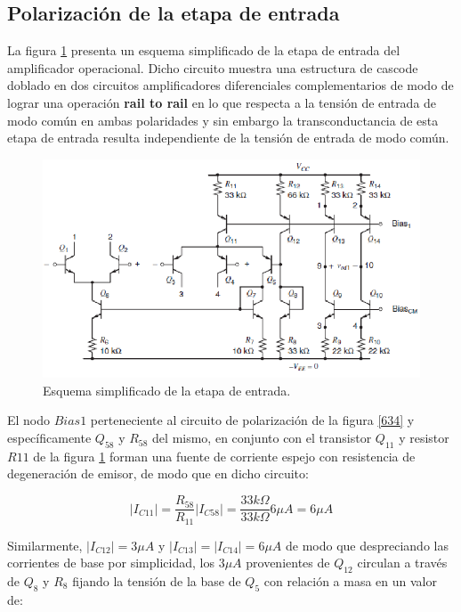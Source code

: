 \documentclass[12pt,a4paper,final,headinclude,footinclude,BCOR5mm]{scrartcl}
\begin{document}
\subsection{Polarización de la etapa de entrada}

La figura \ref{636} presenta un esquema simplificado de la etapa de entrada del amplificador operacional. Dicho circuito muestra una estructura de cascode doblado en dos circuitos amplificadores diferenciales complementarios de modo de lograr una operación \textbf{rail to rail} en lo que respecta a la tensión de entrada de modo común en ambas polaridades y sin embargo la transconductancia de esta etapa de entrada resulta independiente de la tensión de entrada de modo común.\\

\begin{figure}[!h]
\begin{center}
\includegraphics[width=400pt]{./imagenes/inputne5234.png}
\end{center}
\caption{Esquema simplificado de la etapa de entrada.}
\label{636}
\end{figure}

El nodo $Bias1$ perteneciente al circuito de polarización de la figura \ref{634}  y específicamente $Q_{58}$ y $R_{58}$ del mismo, en conjunto con el transistor $Q_{11}$ y resistor $R{11}$ de la figura \ref{636} forman una fuente de corriente espejo con resistencia de degeneración de emisor, de modo que en dicho circuito:

\begin{equation}
|I_{C11}| = \dfrac{R_{58}}{R_{11}}|I_{C58}| = \dfrac{33 k\Omega}{33 k\Omega}6\mu A = 6\mu A
\end{equation}

Similarmente, $|I_{C12}|=3\mu A$ y $|I_{C13}|=|I_{C14}|=6\mu A$ de modo que despreciando las corrientes de base por simplicidad, los $3\mu A$ provenientes de $Q_{12}$ circulan a través de $Q_{8}$ y $R_{8}$ fijando la tensión de la base de $Q_{5}$ con relación a masa en un valor de:
\end{document}
